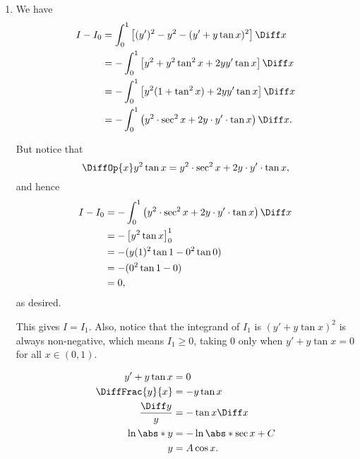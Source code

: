 \Question{\currfilebase}
\begin{enumerate}
    \item We have
          \begin{align*}
              I - I_0 & = \int_{0}^{1} \left[(y')^2 - y^2 - (y' + y \tan x)^2\right] \Diff x                 \\
                      & = - \int_{0}^{1} \left[y^2 + y^2 \tan^2 x + 2y y' \tan x\right] \Diff x              \\
                      & = - \int_{0}^{1} \left[y^2 (1 + \tan^2 x) + 2y y' \tan x \right] \Diff x             \\
                      & = - \int_{0}^{1} \left(y^2 \cdot \sec^2 x + 2y \cdot y' \cdot \tan x\right) \Diff x.
          \end{align*}

          But notice that
          \[
              \DiffOp{x} y^2 \tan x = y^2 \cdot \sec^2 x + 2y \cdot y' \cdot \tan x,
          \]
          and hence
          \begin{align*}
              I - I_0 & = - \int_{0}^{1} \left(y^2 \cdot \sec^2 x + 2y \cdot y' \cdot \tan x\right) \Diff x \\
                      & = - \left[y^2 \tan x\right]_{0}^{1}                                                 \\
                      & = - (y(1)^2 \tan 1 - 0^2 \tan 0)                                                    \\
                      & = - (0^2 \tan 1 - 0)                                                                \\
                      & = 0,
          \end{align*}
          as desired.

          This gives \(I = I_1\). Also, notice that the integrand of \(I_1\) is \((y' + y \tan x)^2\) is always non-negative, which means \(I_1 \geq 0\), taking \(0\) only when \(y' + y \tan x = 0\) for all \(x \in (0, 1)\).

          \begin{align*}
              y' + y \tan x     & = 0                       \\
              \DiffFrac{y}{x}   & = -y \tan x               \\
              \frac{\Diff y}{y} & = - \tan x \Diff x        \\
              \ln\abs*{y}       & = - \ln \abs*{\sec x} + C \\
              y                 & = A\cos x.                \\
          \end{align*}


\end{enumerate}
